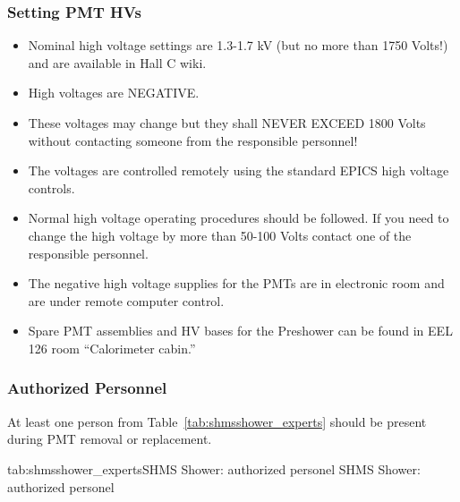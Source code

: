 {\subsubsection*{Setting PMT HVs}
\begin{itemize}
\item Nominal high voltage settings are 1.3-1.7 kV (but no more than
  1750 Volts!)  and are available in Hall C wiki.
\item High voltages are NEGATIVE.
\item These voltages may change but they shall NEVER EXCEED 1800 Volts
  without contacting someone from the responsible personnel!
\item The voltages are controlled remotely using the standard EPICS high voltage controls.
\item Normal high voltage operating procedures should be followed. If
  you need to change the high voltage by more than 50-100 Volts
  contact one of the responsible personnel.
\item The negative high voltage supplies for the PMTs are in
  electronic room and are under remote computer control.
\item Spare PMT assemblies and HV bases for the Preshower can be
  found in EEL 126 room ``Calorimeter cabin.''
\end{itemize}


\subsubsection{Authorized Personnel}
At least one person from Table~\ref{tab:shmsshower_experts} should be
present during PMT removal or replacement.

\begin{namestab}{tab:shmsshower_experts}{SHMS Shower: authorized personel}{
    SHMS Shower: authorized personel}
  \ArshakAsaturyan{}
  \VardanTadevosyan{}
  \HamletMkrtchyan{}
  \ArthurMkrtchyan{}
\end{namestab}


} %
